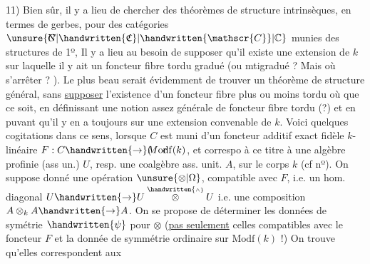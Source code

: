 11) Bien sûr, il y a lieu de chercher des théorèmes de structure intrinsèques, en termes de gerbes, pour des catégories $\unsure{\rlap{\(\mathrm N\)}C|\handwritten{\mathfrak{C}}|\handwritten{\mathscr{C}}|\mathbb{C}}$ munies des structures de 1º, Il y a lieu au besoin de supposer qu'il existe une extension de $k$ sur laquelle il y ait un foncteur fibre tordu gradué (ou mtigradué ? Mais où s'arrêter ? ). Le plus beau serait évidemment de trouver un théorème de structure général, sans \uline{supposer} l'existence d'un foncteur fibre plus ou moins tordu où que ce soit, en définissant une notion assez générale de foncteur fibre tordu (?) et en puvant qu'il y en a toujours sur une extension convenable de $k$.
Voici quelques cogitations dans ce sens, lorsque $C$ est muni d'un foncteur additif exact fidèle $k$-linéaire $F:C\handwritten{\to}\rlap{(}M\mathrm{o}\rlap{\(\mathrm r\)}\mathrm{df}(k)$, et correspo à ce titre à une algèbre profinie (ass un.) $U$, resp. une coalgèbre ass. unit. $A$, sur le corps $k$ (cf nº). On  suppose donné une opération $\unsure{\otimes|\Omega}$, compatible avec $F$, i.e. un hom. diagonal $U\handwritten{\to}U\overset{\handwritten{\scriptscriptstyle\wedge}}{\otimes}U$ i.e. une composition $A\otimes_kA\handwritten{\to}A$. On se propose de déterminer les données de symétrie $\handwritten{\psi}$ pour $\otimes$ (\uline{pas seulement} celles compatibles avec le foncteur $F$ et la donnée de symmétrie ordinaire sur $\mathrm{Modf}(k)$ !) On trouve qu'elles correspondent aux
\margin{\handwritten{[Dans le cas du nº 6, gr\uline{.dué}, on aura $\sigma=\pi^+\unsure{\ominus|\otimes}\pi^++\pi^+\otimes\pi^-+\pi^-\ominus\pi^+-\pi^-\ominus\pi^-$]}}
